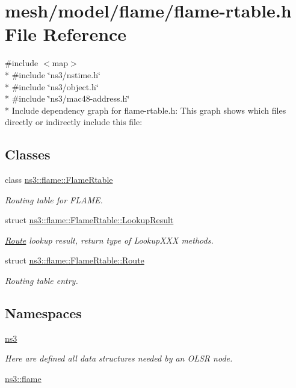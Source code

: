 \hypertarget{flame-rtable_8h}{}\section{mesh/model/flame/flame-\/rtable.h File Reference}
\label{flame-rtable_8h}
{\ttfamily \#include $<$map$>$}\\*
{\ttfamily \#include \char`\"{}ns3/nstime.\+h\char`\"{}}\\*
{\ttfamily \#include \char`\"{}ns3/object.\+h\char`\"{}}\\*
{\ttfamily \#include \char`\"{}ns3/mac48-\/address.\+h\char`\"{}}\\*
Include dependency graph for flame-\/rtable.h\+:
This graph shows which files directly or indirectly include this file\+:
\subsection*{Classes}
\begin{DoxyCompactItemize}
\item 
class \hyperlink{classns3_1_1flame_1_1FlameRtable}{ns3\+::flame\+::\+Flame\+Rtable}
\begin{DoxyCompactList}\small\item\em Routing table for F\+L\+A\+ME. \end{DoxyCompactList}\item 
struct \hyperlink{structns3_1_1flame_1_1FlameRtable_1_1LookupResult}{ns3\+::flame\+::\+Flame\+Rtable\+::\+Lookup\+Result}
\begin{DoxyCompactList}\small\item\em \hyperlink{structns3_1_1flame_1_1FlameRtable_1_1Route}{Route} lookup result, return type of Lookup\+X\+XX methods. \end{DoxyCompactList}\item 
struct \hyperlink{structns3_1_1flame_1_1FlameRtable_1_1Route}{ns3\+::flame\+::\+Flame\+Rtable\+::\+Route}
\begin{DoxyCompactList}\small\item\em Routing table entry. \end{DoxyCompactList}\end{DoxyCompactItemize}
\subsection*{Namespaces}
\begin{DoxyCompactItemize}
\item 
 \hyperlink{namespacens3}{ns3}
\begin{DoxyCompactList}\small\item\em Here are defined all data structures needed by an O\+L\+SR node. \end{DoxyCompactList}\item 
 \hyperlink{namespacens3_1_1flame}{ns3\+::flame}
\end{DoxyCompactItemize}
